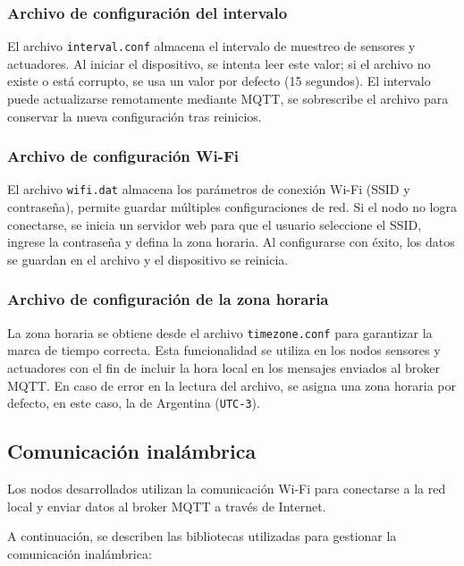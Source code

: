 \subsubsection{Archivo de configuración del intervalo}

El archivo \texttt{interval.conf} almacena el intervalo de muestreo de sensores
y actuadores. Al iniciar el dispositivo, se intenta leer este valor; si el
archivo no existe o está corrupto, se usa un valor por defecto (15 segundos).
El intervalo puede actualizarse remotamente mediante MQTT, se sobrescribe el
archivo para conservar la nueva configuración tras reinicios.

\subsubsection{Archivo de configuración Wi-Fi}

El archivo \texttt{wifi.dat} almacena los parámetros de conexión Wi-Fi (SSID y
contraseña), permite guardar múltiples configuraciones de red. Si el nodo no
logra conectarse, se inicia un servidor web para que el usuario seleccione el
SSID, ingrese la contraseña y defina la zona horaria. Al configurarse con
éxito, los datos se guardan en el archivo y el dispositivo se reinicia.

\subsubsection{Archivo de configuración de la zona horaria}

La zona horaria se obtiene desde el archivo \texttt{timezone.conf} para
garantizar la marca de tiempo correcta. Esta funcionalidad se utiliza en los
nodos sensores y actuadores con el fin de incluir la hora local en los mensajes
enviados al broker MQTT. En caso de error en la lectura del archivo, se asigna
una zona horaria por defecto, en este caso, la de Argentina (\texttt{UTC-3}).


\subsection{Comunicación inalámbrica}

Los nodos desarrollados utilizan la comunicación Wi-Fi para conectarse a la red
local y enviar datos al broker MQTT a través de Internet.

A continuación, se describen las bibliotecas utilizadas para gestionar la
comunicación inalámbrica:

